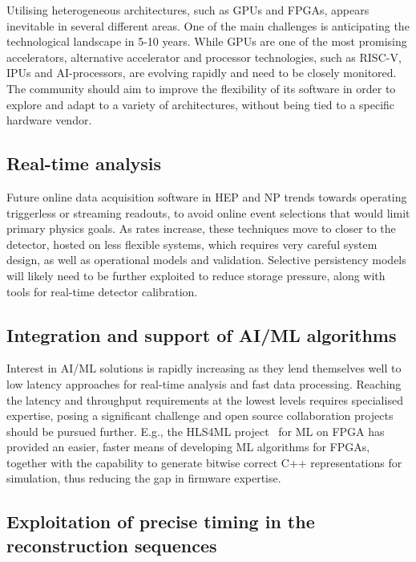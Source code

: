 \documentclass[10pt,a4paper]{article}
\begin{document}
Utilising heterogeneous architectures, such as GPUs and FPGAs, appears
inevitable in several different areas. One of the main challenges is
anticipating the technological landscape in 5-10 years. While GPUs are one of
the most promising accelerators, alternative accelerator and processor
technologies, such as RISC-V, IPUs and AI-processors, are evolving rapidly and
need to be closely monitored. The community should aim to improve the
flexibility of its software in order to explore and adapt to a variety of
architectures, without being tied to a specific hardware vendor.

\subsection{Real-time analysis}\label{real-time-analysis}

Future online data acquisition software in HEP and NP trends towards operating
triggerless or streaming readouts, to avoid online event selections that would
limit primary physics goals. As rates increase, these techniques move to closer
to the detector, hosted on less flexible systems, which requires very careful
system design, as well as operational models and validation. Selective
persistency models will likely need to be further exploited to reduce storage
pressure, along with tools for real-time detector calibration.

\subsection{Integration and support of AI/ML
algorithms}\label{integration-and-support-of-aiml-algorithms}

Interest in AI/ML solutions is rapidly increasing as they lend themselves well
to low latency approaches for real-time analysis and fast data processing.
Reaching the latency and throughput requirements at the lowest levels requires
specialised expertise, posing a significant challenge and open source
collaboration projects should be pursued further. E.g., the HLS4ML
project~\cite{fastml_hls4ml,Duarte:2018ite} for ML on FPGA has provided an
easier, faster means of developing ML algorithms for FPGAs, together with the
capability to generate bitwise correct C++ representations for simulation,
thus reducing the gap in firmware expertise.

\subsection{Exploitation of precise timing in the reconstruction
sequences}\label{exploitation-of-precise-timing-in-the-reconstruction-sequences}
\end{document}
